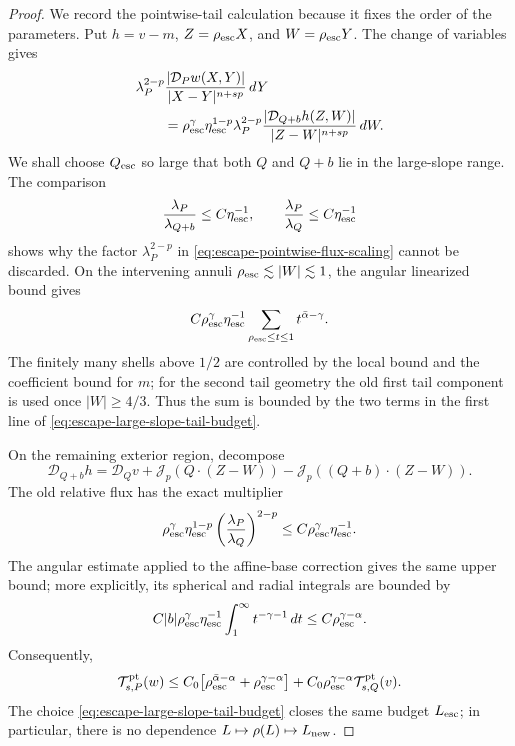 \documentclass[11pt,reqno]{amsart}
\numberwithin{equation}{section}
\newcommand{\Jp}{\mathcal J_p}
\newcommand{\dd}{\,d}
\theoremstyle{remark}
\begin{document}
\begin{proof}
We record the pointwise-tail calculation because it fixes the order of
the parameters.  Put \(h=v-m\), \(Z=\rho_{\rm esc}X\), and
\(W=\rho_{\rm esc}Y\).  The change of variables gives
\begin{equation}
 \begin{split}
 &\lambda_P^{2-p}
 \frac{|\mathcal D_Pw(X,Y)|}{|X-Y|^{n+sp}}\dd Y\\
 &\qquad=
 \rho_{\rm esc}^{\gamma}\eta_{\rm esc}^{1-p}
 \lambda_P^{2-p}
 \frac{|\mathcal D_{Q+b}h(Z,W)|}
 {|Z-W|^{n+sp}}\dd W .
 \end{split}
 \label{eq:escape-pointwise-flux-scaling}
\end{equation}
We shall choose \(Q_{\rm esc}\) so large that both \(Q\) and
\(Q+b\) lie in the large-slope range.  The comparison
\begin{equation*}
 \frac{\lambda_P}{\lambda_{Q+b}}\le C\eta_{\rm esc}^{-1},
 \qquad
 \frac{\lambda_P}{\lambda_Q}\le C\eta_{\rm esc}^{-1}
\end{equation*}
shows why the factor \(\lambda_P^{2-p}\) in
\eqref{eq:escape-pointwise-flux-scaling} cannot be discarded.  On the
intervening annuli
\(\rho_{\rm esc}\lesssim|W|\lesssim1\), the angular linearized bound
gives
\begin{equation*}
 C\rho_{\rm esc}^{\gamma}\eta_{\rm esc}^{-1}
 \sum_{\rho_{\rm esc}\le t\le1}t^{\bar\alpha-\gamma}.
\end{equation*}
The finitely many shells above \(1/2\) are controlled by the local
bound and the coefficient bound for \(m\); for the second tail
geometry the old first tail component is used once
\(|W|\ge4/3\).  Thus the sum is bounded by the two terms in the
first line of \eqref{eq:escape-large-slope-tail-budget}.

On the remaining exterior region, decompose
\[
 \mathcal D_{Q+b}h
 =\mathcal D_Qv+
 \Jp(Q\cdot(Z-W))-\Jp((Q+b)\cdot(Z-W)).
\]
The old relative flux has the exact multiplier
\begin{equation*}
 \rho_{\rm esc}^{\gamma}\eta_{\rm esc}^{1-p}
 \left(\frac{\lambda_P}{\lambda_Q}\right)^{2-p}
 \le C\rho_{\rm esc}^{\gamma}\eta_{\rm esc}^{-1}.
\end{equation*}
The angular estimate applied to the affine-base correction gives the
same upper bound; more explicitly, its spherical and radial integrals
are bounded by
\[
 C|b|\rho_{\rm esc}^{\gamma}\eta_{\rm esc}^{-1}
 \int_1^\infty t^{-\gamma-1}\dd t
 \le C\rho_{\rm esc}^{\gamma-\alpha}.
\]
Consequently,
\begin{align}
 \mathcal T^{\rm pt}_{s,P}(w)
 \le C_0\bigl[
 \rho_{\rm esc}^{\bar\alpha-\alpha}
 +\rho_{\rm esc}^{\gamma-\alpha}\bigr]
 +C_0\rho_{\rm esc}^{\gamma-\alpha}
 \mathcal T^{\rm pt}_{s,Q}(v).
 \label{eq:escape-pointwise-tail-recurrence}
\end{align}
The choice \eqref{eq:escape-large-slope-tail-budget} closes the same
budget \(L_{\rm esc}\); in particular, there is no dependence
\(L\mapsto\rho(L)\mapsto L_{\rm new}\).


\end{proof}
\end{document}
